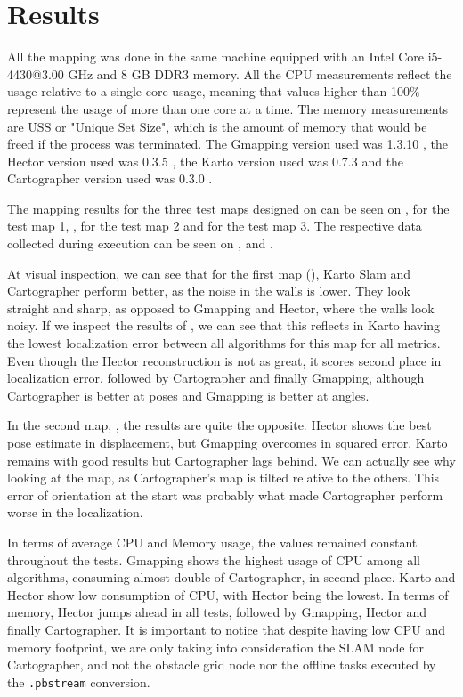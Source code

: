 \section{Results}

All the mapping was done in the same machine equipped with an Intel Core i5-4430@3.00 GHz and 8 GB DDR3 memory. All the CPU measurements reflect the usage relative to a single core usage, meaning that values higher than 100\% represent the usage of more than one core at a time. The memory measurements are USS or "Unique Set Size", which is the amount of memory that would be freed if the process was terminated. The Gmapping version used was 1.3.10 \cite{gmappinggit}, the Hector version used was 0.3.5 \cite{hectorgit}, the Karto version used was 0.7.3 \cite{kartogit} and the Cartographer version used was 0.3.0 \cite{cartographergit}.

The mapping results for the three test maps designed on  can be seen on , for the test map 1, , for the test map 2 and  for the test map 3. The respective data collected during execution can be seen on ,  and .

At visual inspection, we can see that for the first map (), Karto Slam and Cartographer perform better, as the noise in the walls is lower. They look straight and sharp, as opposed to Gmapping and Hector, where the walls look noisy. If we inspect the results of , we can see that this reflects in Karto having the lowest localization error between all algorithms for this map for all metrics. Even though the Hector reconstruction is not as great, it scores second place in localization error, followed by Cartographer and finally Gmapping, although Cartographer is better at poses and Gmapping is better at angles.

In the second map, , the results are quite the opposite. Hector shows the best pose estimate in displacement, but Gmapping overcomes in squared error. Karto remains with good results but Cartographer lags behind. We can actually see why looking at the map, as Cartographer's map is tilted relative to the others. This error of orientation at the start was probably what made Cartographer perform worse in the localization.

In terms of average CPU and Memory usage, the values remained constant throughout the tests. Gmapping shows the highest usage of CPU among all algorithms, consuming almost double of Cartographer, in second place. Karto and Hector show low consumption of CPU, with Hector being the lowest. In terms of memory, Hector jumps ahead in all tests, followed by Gmapping, Hector and finally Cartographer. It is important to notice that despite having low CPU and memory footprint, we are only taking into consideration the SLAM node for Cartographer, and not the obstacle grid node nor the offline tasks executed by the \texttt{.pbstream} conversion.

